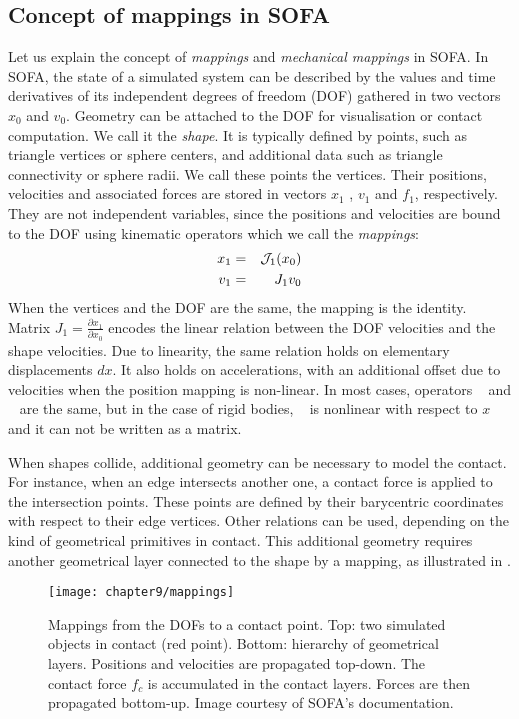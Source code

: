 	\subsection{Concept of mappings in SOFA}	\label{chap9:mappings}
Let us explain the concept of \emph{mappings} and \emph{mechanical mappings} in SOFA. In SOFA, the state of a simulated system can be described by the values and time derivatives of its independent degrees of freedom (DOF) gathered in two vectors $x_0$ and $v_0$. Geometry can be attached to the DOF for visualisation or contact computation. We call it the \emph{shape}. It is typically defined by points, such as triangle vertices or sphere centers, and additional data such as triangle connectivity or sphere radii. We call these points the vertices. Their positions, velocities and associated forces are stored in vectors $x_1$ , $v_1$ and $f_1$, respectively. They are not independent variables, since the positions and velocities are bound to the DOF using kinematic operators which we call the \emph{mappings}:
\begin{eqnarray*}
x_1 &=&\mathcal{J}_1(x_0)\\ 
v_1 &=& J_1 v_0
\end{eqnarray*}
When the vertices and the DOF are the same, the mapping is the identity. Matrix $J_1 = \frac{\partial x_1}{\partial x_0}$ encodes the linear relation between the DOF velocities and the shape velocities. Due to linearity, the same relation holds on elementary displacements $dx$. It also holds on accelerations, with an additional offset due to velocities when the position mapping \JNL is non-linear. In most cases, operators \JNL~ and \J~ are the same, but in the case of rigid bodies, \JNL~ is nonlinear with respect to $x$ and it can not be written as a matrix.

When shapes collide, additional geometry can be necessary to model the contact. For instance, when an edge intersects another one, a contact force is applied to the intersection points. These points are defined by their barycentric coordinates with respect to their edge vertices. Other relations can be used, depending on the kind of geometrical primitives in contact. This additional geometry requires another geometrical layer connected to the shape by a mapping, as illustrated in .

\begin{figure}[ht]
	\begin{center}
 		\texttt{[image: chapter9/mappings]}
 	\end{center}
 \caption[Concept of mappings in SOFA]{Mappings from the DOFs to a contact point. Top: two simulated objects in contact (red point). Bottom: hierarchy of geometrical layers. Positions and velocities are propagated top-down. The contact force $f_c$ is accumulated in the contact layers. Forces are then propagated bottom-up. Image courtesy of SOFA's documentation. }
\label{chap9:fig-mappings}
\end{figure}

